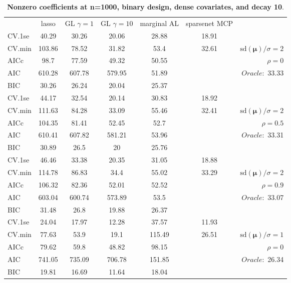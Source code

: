 \clearpage
\begin{table}\vspace{-.5cm}
\caption[l]{ { \bf Nonzero coefficients at n=1000, binary design, 
dense covariates, and  decay  10}.}
\vspace{-.5cm}
\footnotesize{}
\begin{center}
\begin{tabular}{l*{5}{c}|r}
& lasso & GL $\gamma=1$ & GL $\gamma=10$ & marginal AL & sparsenet MCP  & \\
 \cline{1-7}
CV.1se & 40.29 & 30.26 & 20.06 & 28.88 & 18.91 & \\
CV.min & 103.86 & 78.52 & 31.82 & 53.4 & 32.61 &  $\mathrm{sd}(\mathbf{\mu})/\sigma=2$ \\
AICc & 98.7 & 77.59 & 49.32 & 50.55 & & $\rho=0$ \\
AIC & 610.28 & 607.78 & 579.95 & 51.89 & &  \multirow{2}{*}{$Oracle: $ 33.33} \\
BIC & 30.26 & 26.24 & 20.04 & 25.37 & &  \\
 \hline 
CV.1se & 44.17 & 32.54 & 20.14 & 30.83 & 18.92 & \\
CV.min & 111.63 & 84.28 & 33.09 & 55.46 & 32.41 &  $\mathrm{sd}(\mathbf{\mu})/\sigma=2$ \\
AICc & 104.35 & 81.41 & 52.45 & 52.7 & & $\rho=0.5$ \\
AIC & 610.41 & 607.82 & 581.21 & 53.96 & &  \multirow{2}{*}{$Oracle: $ 33.31} \\
BIC & 30.89 & 26.5 & 20 & 25.76 & &  \\
 \hline 
CV.1se & 46.46 & 33.38 & 20.35 & 31.05 & 18.88 & \\
CV.min & 114.78 & 86.83 & 34.4 & 55.02 & 33.29 &  $\mathrm{sd}(\mathbf{\mu})/\sigma=2$ \\
AICc & 106.32 & 82.36 & 52.01 & 52.52 & & $\rho=0.9$ \\
AIC & 603.04 & 600.74 & 573.89 & 53.5 & &  \multirow{2}{*}{$Oracle: $ 33.07} \\
BIC & 31.48 & 26.8 & 19.88 & 26.37 & &  \\
 \hline 
CV.1se & 24.04 & 17.97 & 12.28 & 37.57 & 11.93 & \\
CV.min & 77.63 & 53.9 & 19.1 & 115.49 & 26.51 &  $\mathrm{sd}(\mathbf{\mu})/\sigma=1$ \\
AICc & 79.62 & 59.8 & 48.82 & 98.15 & & $\rho=0$ \\
AIC & 741.05 & 735.09 & 706.78 & 151.85 & &  \multirow{2}{*}{$Oracle: $ 26.34} \\
BIC & 19.81 & 16.69 & 11.64 & 18.04 & &  \\

\end{tabular}
\end{center}
\end{table}
